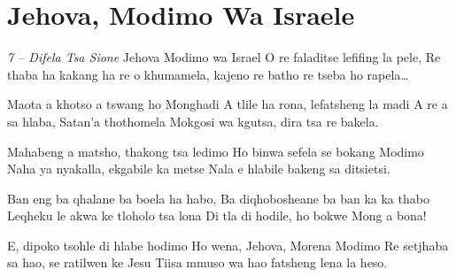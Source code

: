 \starttocol
\chapter{Jehova, Modimo Wa Israele}
\nexttocol
\hfill{\it 7 -- Difela Tsa Sione}
\stoptocol
\starttocol
\startlines
{\sc Jehova Modimo} wa Israel 
O re faladitse lefifing la pele, 
Re thaba ha kakang ha re o khumamela, 
kajeno re batho re tseba ho rapela\dots

Maota a khotso a tswang ho Monghadi
A tlile ha rona, lefatsheng la madi
A re a sa hlaba, Satan’a thothomela
Mokgosi wa kgutsa, dira tsa re bakela.

Mahabeng a matsho, thakong tsa ledimo
Ho binwa sefela se bokang Modimo
Naha ya nyakalla, ekgabile ka metse
Nala e hlabile bakeng sa ditsietsi.

Ban eng ba qhalane ba boela ha habo,
Ba diqhobosheane ba ban ka ka thabo
Leqheku le akwa ke tloholo tsa lona
Di tla di hodile, ho bokwe Mong a bona!

E, dipoko tsohle di hlabe hodimo
Ho wena, Jehova, Morena Modimo
Re setjhaba sa hao, se ratilwen ke Jesu
Tiisa mmuso wa hao fatsheng lena la heso.

\stoplines
\nexttocol

\stoptocol
